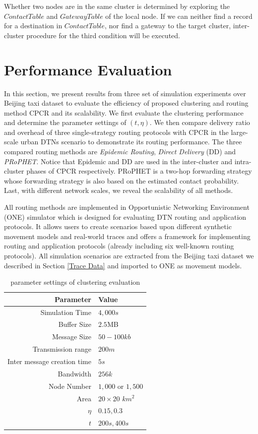\documentclass[conference]{IEEEtran}
\begin{document}
Whether two nodes are in the same cluster is determined by exploring the $ContactTable$ and $GatewayTable$ of the local node. If we can neither find a record for a destination in $ContactTable$, nor find a gateway to the target cluster, inter-cluster procedure for the third condition will be executed.

\section{Performance Evaluation}
\label{Section6_simulation}

In this section, we present results from three set of simulation experiments over Beijing taxi dataset to evaluate the efficiency of proposed clustering and routing method CPCR and its scalability. We first evaluate the clustering performance and determine the parameter settings of $(t, \eta)$. We then compare delivery ratio and overhead of three single-strategy routing protocols with CPCR in the large-scale urban DTNs scenario to demonstrate its routing performance. The three compared routing methods are \emph{Epidemic Routing}, \emph{Direct Delivery} (DD) and \emph{PRoPHET}. Notice that  Epidemic and DD are used in the inter-cluster and intra-cluster phases of CPCR respectively.  PRoPHET is a two-hop forwarding strategy whose forwarding strategy is also based on the estimated contact probability. Last, with different network scales, we reveal the scalability of all methods.

All routing methods are implemented in Opportunistic Networking Environment (ONE)\cite{KeranenOtt-155} simulator which is designed for evaluating DTN routing and application protocols. It allows users to create scenarios based upon different synthetic movement models and real-world traces and offers a framework for implementing routing and application protocols (already including six well-known routing protocols). All simulation scenarios are extracted from the Beijing taxi dataset we described in Section \ref{Trace Data} and imported to ONE as movement models.
\begin{table}[!t]
  \centering
  \caption{parameter settings of clustering evaluation}\label{table_label_parameter_settings}
  \vspace{.1in}
  \begin{tabular}[c]{r|l}
  \hline
  Parameter & Value \\
  \hline
  Simulation Time & $4,000s$\\
  Buffer Size & $2.5$MB \\
  Message Size & $50-100kb$\\
  Transmission range & $200m$ \\
  Inter message creation time & $5s$\\
  Bandwidth & $256k$ \\
  Node Number & $1,000$ or $1,500$ \\
  Area & $20\times 20$ $km^{2}$ \\
  $\eta$ & $0.15,0.3$ \\
  $t$ & $200s,400s$ \\
  \hline
  \end{tabular}
\end{table}
\end{document}
